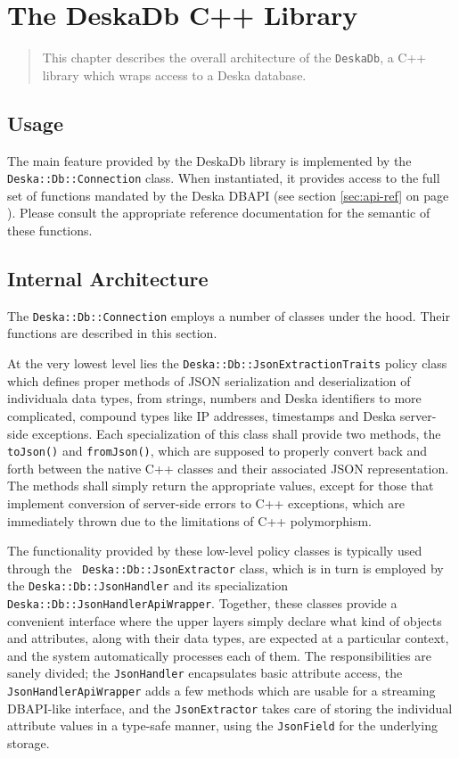 \documentclass[deska]{subfiles}
\begin{document}
\chapter{The DeskaDb C++ Library}

\begin{abstract}
This chapter describes the overall architecture of the {\tt DeskaDb}, a C++ library which wraps access to a Deska
database.
\end{abstract}

\section{Usage}

The main feature provided by the DeskaDb library is implemented by the {\tt Deska::Db::Connection} class.  When
instantiated, it provides access to the full set of functions mandated by the Deska DBAPI (see section \ref{sec:api-ref}
on page \pageref{sec:api-ref}).  Please consult the appropriate reference documentation for the semantic of these
functions.

\section{Internal Architecture}

The {\tt Deska::Db::Connection} employs a number of classes under the hood.  Their functions are described in this
section.

At the very lowest level lies the {\tt Deska::Db::JsonExtractionTraits} policy class which defines proper methods of
JSON serialization and deserialization of individuala data types, from strings, numbers and Deska identifiers to more
complicated, compound types like IP addresses, timestamps and Deska server-side exceptions.  Each specialization of this
class shall provide two methods, the {\tt toJson()} and {\tt fromJson()}, which are supposed to properly convert back
and forth between the native C++ classes and their associated JSON representation.  The methods shall simply return the
appropriate values, except for those that implement conversion of server-side errors to C++ exceptions, which are
immediately thrown due to the limitations of C++ polymorphism.

The functionality provided by these low-level policy classes is typically used through the {\tt
Deska::Db::JsonExtractor} class, which is in turn is employed by the {\tt Deska::Db::JsonHandler} and its specialization
{\tt Deska::Db::JsonHandlerApiWrapper}.  Together, these classes provide a convenient interface where the upper layers
simply declare what kind of objects and attributes, along with their data types, are expected at a particular context,
and the system automatically processes each of them.  The responsibilities are sanely divided; the {\tt JsonHandler}
encapsulates basic attribute access, the {\tt JsonHandlerApiWrapper} adds a few methods which are usable for a streaming
DBAPI-like interface, and the {\tt JsonExtractor} takes care of storing the individual attribute values in a type-safe
manner, using the {\tt JsonField} for the underlying storage.
\end{document}
